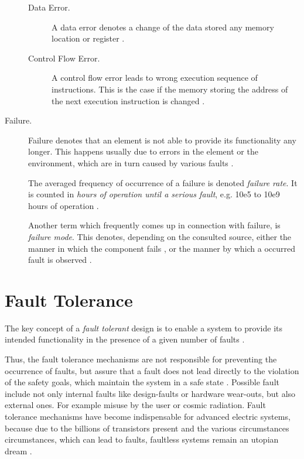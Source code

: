\begin{description}
\begin{description}
\item [Data Error.]
A data error denotes a change of the data stored any memory location or register \cite{elattar2007}.

\item [Control Flow Error.]
A control flow error leads to wrong execution sequence of instructions. This is the case if the memory storing the address of the next execution instruction is changed \cite{elattar2007}.
\end{description}

\item [Failure.]
Failure denotes that an element is not able to provide its functionality any longer. This happens usually due to errors in the element or the environment, which are in turn caused by various faults \cite{iso26262:1} \cite{nelson} \cite{autosar_glossary}.

The averaged frequency of occurrence of a failure is denoted \emph{failure rate}. It is counted in \emph{hours of operation until a serious fault}, e.g. 10e5 to 10e9 hours of operation \cite{rodrigues2011}.

Another term which frequently comes up in connection with failure, is \emph{failure mode}. This denotes, depending on the consulted source, either the manner in which the component fails \cite{international2006analysis}, or the manner by which a occurred fault is observed \cite{mil1980}.
\end{description}



\section{Fault Tolerance}
\label{ch:fault_tolerance}

The key concept of a \emph{fault tolerant} design is to enable a system to provide its intended functionality in the presence of a given number of faults \cite{nelson}.

Thus, the fault tolerance mechanisms are not responsible for preventing the occurrence of faults, but assure that a fault does not lead directly to the violation of the safety goals, which maintain the system in a safe state \cite{iso26262:1}. Possible fault include not only internal faults like design-faults or hardware wear-outs, but also external ones. For example misuse by the user or cosmic radiation. Fault tolerance mechanisms have become indispensable for advanced electric systems, because due to the billions of transistors present and the various circumstances circumstances, which can lead to faults, faultless systems remain an utopian dream \cite{genesys}.


